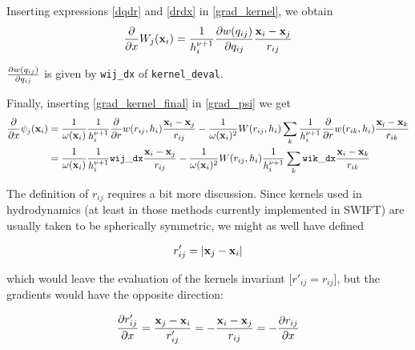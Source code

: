 Inserting expressions \ref{dqdr} and \ref{drdx} in \ref{grad_kernel}, we obtain
\begin{equation}
	\frac{\partial}{\partial x} W_j (\mathbf{x}_i)  = \frac{1}{h_i^{\nu + 1}} \frac{\partial w(q_{ij})}{\partial q_{ij}}  \frac{\mathbf{x}_i - \mathbf{x}_j}{r_{ij}} 	\label{grad_kernel_final}
\end{equation}



$\frac{\partial w(q_{ij})}{\partial q_{ij}}$ is given by \verb|wij_dx| of \verb|kernel_deval|.







Finally, inserting \ref{grad_kernel_final} in \ref{grad_psi} we get
\begin{align}
	\deldx \psi_j (\x_i) &= 
		\frac{1}{\omega(\x_i)} \frac{1}{h_i^{\nu + 1}} \deldr{w}(r_{ij}, h_i)  \frac{\x_i - \x_j}{r_{ij}} 	 -
		\frac{1}{\omega(\x_i)^2} W(r_{ij}, h_i) \sum_k \frac{1}{h_i^{\nu + 1}} \deldr{w}(r_{ik}, h_i)  \frac{\x_i - \x_k}{r_{ik}} \nonumber \\
   	 &= 
   		\frac{1}{\omega(\x_i)} \frac{1}{h_i^{\nu + 1}} \mathtt{wij\_dx}  \frac{\x_i - \x_j}{r_{ij}} 	 -
   		\frac{1}{\omega(\x_i)^2} W(r_{ij}, h_i) \frac{1}{h_i^{\nu + 1}} \sum_k \mathtt{wik\_dx}  \frac{\x_i - \x_k}{r_{ik}}
\end{align}






















The definition of $r_{ij}$ requires a bit more discussion.
Since kernels used in hydrodynamics (at least in those methods currently implemented in SWIFT) are usually taken to be spherically symmetric, we might as well have defined

\begin{align*}
r'_{ij} = |\mathbf{x}_j - \mathbf{x}_i |
\end{align*}

which would leave the evaluation of the kernels invariant [$r'_{ij} = r_{ij}$], but the gradients would have the opposite direction:

\begin{align*}
\frac{\partial r'_{ij}}{\partial x}	
=   \frac{\mathbf{x}_j - \mathbf{x}_i}{r'_{ij}} 
= - \frac{\mathbf{x}_i - \mathbf{x}_j}{r_{ij}}
= - \frac{\partial r_{ij}}{\partial x}
\end{align*}

